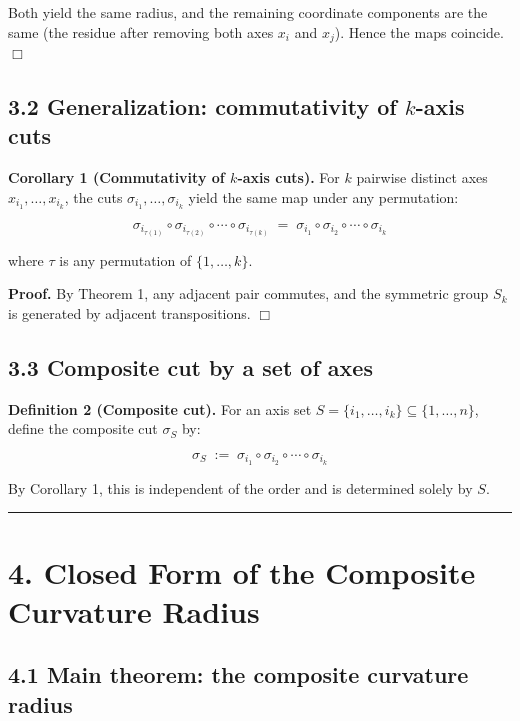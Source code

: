 \documentclass[a4paper,11pt]{article}
\theoremstyle{definition}
\theoremstyle{remark}
\begin{document}
Both yield the same radius, and the remaining coordinate components are
the same (the residue after removing both axes \(x_i\) and \(x_j\)).
Hence the maps coincide. \(\Box\)

\subsection{\texorpdfstring{3.2 Generalization: commutativity of
\(k\)-axis
cuts}{3.2 Generalization: commutativity of k-axis cuts}}\label{generalization-commutativity-of-k-axis-cuts}

\textbf{Corollary 1 (Commutativity of \(k\)-axis cuts).} For \(k\)
pairwise distinct axes \(x_{i_1}, \ldots, x_{i_k}\), the cuts
\(\sigma_{i_1}, \ldots, \sigma_{i_k}\) yield the same map under any
permutation:

\[
\sigma_{i_{\tau(1)}} \circ \sigma_{i_{\tau(2)}} \circ \cdots \circ \sigma_{i_{\tau(k)}} \;=\; \sigma_{i_1} \circ \sigma_{i_2} \circ \cdots \circ \sigma_{i_k}
\]

where \(\tau\) is any permutation of \(\{1, \ldots, k\}\).

\textbf{Proof.} By Theorem 1, any adjacent pair commutes, and the
symmetric group \(S_k\) is generated by adjacent transpositions.
\(\Box\)

\subsection{3.3 Composite cut by a set of
axes}\label{composite-cut-by-a-set-of-axes}

\textbf{Definition 2 (Composite cut).} For an axis set
\(S = \{i_1, \ldots, i_k\} \subseteq \{1, \ldots, n\}\), define the
composite cut \(\sigma_S\) by:

\[
\sigma_S \;:=\; \sigma_{i_1} \circ \sigma_{i_2} \circ \cdots \circ \sigma_{i_k}
\]

By Corollary 1, this is independent of the order and is determined
solely by \(S\).

\begin{center}\rule{0.5\linewidth}{0.5pt}\end{center}

\section{4. Closed Form of the Composite Curvature
Radius}\label{closed-form-of-the-composite-curvature-radius}

\subsection{4.1 Main theorem: the composite curvature
radius}\label{main-theorem-the-composite-curvature-radius}
\end{document}
